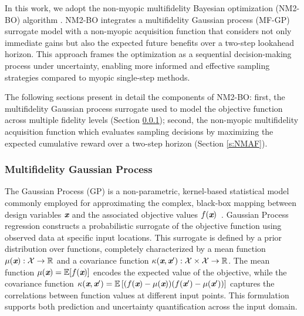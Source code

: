 In this work, we adopt the non-myopic multifidelity Bayesian optimization (NM2-BO) algorithm \cite{DiFioreMaininiNM2BO}. NM2-BO integrates a multifidelity Gaussian process (MF-GP) surrogate model with a non-myopic acquisition function that considers not only immediate gains but also the expected future benefits over a two-step lookahead horizon. This approach frames the optimization as a sequential decision-making process under uncertainty, enabling more informed and effective sampling strategies compared to myopic single-step methods.

The following sections present in detail the components of NM2-BO: first, the multifidelity Gaussian process surrogate used to model the objective function across multiple fidelity levels (Section \ref{s:MFGP}); second, the non-myopic multifidelity acquisition function which evaluates sampling decisions by maximizing the expected cumulative reward over a two-step horizon (Section \ref{s:NMAF}).

\subsubsection{Multifidelity Gaussian Process}
\label{s:MFGP}

The Gaussian Process (GP) is a non-parametric, kernel-based statistical model commonly employed for approximating the complex, black-box mapping between design variables $\textbf{\em x}$ and the associated objective values $f(\textbf{\em x})$~\cite{williams1995gaussian, schulz2018tutorial}. Gaussian Process regression constructs a probabilistic surrogate of the objective function using observed data at specific input locations. This surrogate is defined by a prior distribution over functions, completely characterized by a mean function $\mu(\textbf{\em x}) : \mathcal{X} \rightarrow \mathbb{R}$ and a covariance function $\kappa(\textbf{\em x}, \textbf{\em x}') : \mathcal{X} \times \mathcal{X} \rightarrow \mathbb{R}$. The mean function $\mu(\textbf{\em x}) = \mathbb{E}[f(\textbf{\em x})]$ encodes the expected value of the objective, while the covariance function $\kappa(\textbf{\em x}, \textbf{\em x}') = \mathbb{E} \left[ (f(\textbf{\em x})-\mu(\textbf{\em x}))(f(\textbf{\em x}')-\mu(\textbf{\em x}')) \right]$ captures the correlations between function values at different input points. This formulation supports both prediction and uncertainty quantification across the input domain.

